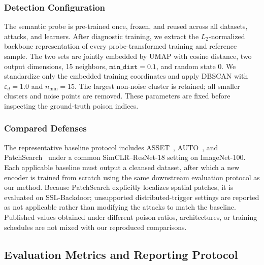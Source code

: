 \documentclass[10pt,journal]{IEEEtran}
\begin{document}
\subsubsection{Detection Configuration}
The semantic probe is pre-trained once, frozen, and reused across all
datasets, attacks, and learners. After diagnostic training, we extract the
$L_2$-normalized backbone representation of every probe-transformed
training and reference sample. The two sets are jointly embedded by UMAP
with cosine distance, two output dimensions, 15 neighbors,
$\texttt{min\_dist}=0.1$, and random state 0. We standardize only the
embedded training coordinates and apply DBSCAN with
$\varepsilon_d=1.0$ and $n_{\min}=15$. The largest non-noise cluster is
retained; all smaller clusters and noise points are removed. These
parameters are fixed before inspecting the ground-truth poison indices.

\subsubsection{Compared Defenses}
The representative baseline protocol includes ASSET~\cite{Pan2023ASSET},
AUTO~\cite{Chen2025AUTO}, and PatchSearch~\cite{Tejankar2023PatchSearch}
under a common SimCLR--ResNet-18 setting on ImageNet-100. Each applicable
baseline must output a cleansed dataset, after which a new encoder is
trained from scratch using the same downstream evaluation protocol as our
method. Because PatchSearch explicitly localizes spatial patches, it is
evaluated on SSL-Backdoor; unsupported distributed-trigger settings are
reported as not applicable rather than modifying the attacks to match the
baseline. Published values obtained under different poison ratios,
architectures, or training schedules are not mixed with our reproduced
comparisons.

\subsection{Evaluation Metrics and Reporting Protocol}
\label{sec:evaluation_metrics}
\end{document}
